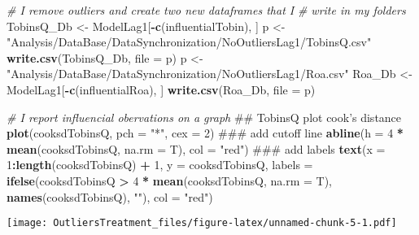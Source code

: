 \documentclass[]{article}
\newenvironment{Shaded}{\begin{snugshade}}{\end{snugshade}}
\newcommand{\KeywordTok}[1]{\textcolor[rgb]{0.13,0.29,0.53}{\textbf{#1}}}
\newcommand{\DataTypeTok}[1]{\textcolor[rgb]{0.13,0.29,0.53}{#1}}
\newcommand{\DecValTok}[1]{\textcolor[rgb]{0.00,0.00,0.81}{#1}}
\newcommand{\StringTok}[1]{\textcolor[rgb]{0.31,0.60,0.02}{#1}}
\newcommand{\CommentTok}[1]{\textcolor[rgb]{0.56,0.35,0.01}{\textit{#1}}}
\newcommand{\OperatorTok}[1]{\textcolor[rgb]{0.81,0.36,0.00}{\textbf{#1}}}
\newcommand{\NormalTok}[1]{#1}
\begin{document}
\begin{Shaded}
\begin{Highlighting}[]
\CommentTok{# I remove outliers and create two new dataframes that I}
\CommentTok{# write in my folders}
\NormalTok{TobinsQ_Db <-}\StringTok{ }\NormalTok{ModelLag1[}\OperatorTok{-}\KeywordTok{c}\NormalTok{(influentialTobin), ]}
\NormalTok{p <-}\StringTok{ "Analysis/DataBase/DataSynchronization/NoOutliersLag1/TobinsQ.csv"}
\KeywordTok{write.csv}\NormalTok{(TobinsQ_Db, }\DataTypeTok{file =}\NormalTok{ p)}
\NormalTok{p <-}\StringTok{ "Analysis/DataBase/DataSynchronization/NoOutliersLag1/Roa.csv"}
\NormalTok{Roa_Db <-}\StringTok{ }\NormalTok{ModelLag1[}\OperatorTok{-}\KeywordTok{c}\NormalTok{(influentialRoa), ]}
\KeywordTok{write.csv}\NormalTok{(Roa_Db, }\DataTypeTok{file =}\NormalTok{ p)}
\end{Highlighting}
\end{Shaded}

\begin{Shaded}
\begin{Highlighting}[]
\CommentTok{# I report influencial obervations on a graph}
\NormalTok{## TobinsQ plot cook's distance}
\KeywordTok{plot}\NormalTok{(cooksdTobinsQ, }\DataTypeTok{pch =} \StringTok{"*"}\NormalTok{, }\DataTypeTok{cex =} \DecValTok{2}\NormalTok{)}
\NormalTok{### add cutoff line}
\KeywordTok{abline}\NormalTok{(}\DataTypeTok{h =} \DecValTok{4} \OperatorTok{*}\StringTok{ }\KeywordTok{mean}\NormalTok{(cooksdTobinsQ, }\DataTypeTok{na.rm =}\NormalTok{ T), }\DataTypeTok{col =} \StringTok{"red"}\NormalTok{)}
\NormalTok{### add labels}
\KeywordTok{text}\NormalTok{(}\DataTypeTok{x =} \DecValTok{1}\OperatorTok{:}\KeywordTok{length}\NormalTok{(cooksdTobinsQ) }\OperatorTok{+}\StringTok{ }\DecValTok{1}\NormalTok{, }\DataTypeTok{y =}\NormalTok{ cooksdTobinsQ, }
    \DataTypeTok{labels =} \KeywordTok{ifelse}\NormalTok{(cooksdTobinsQ }\OperatorTok{>}\StringTok{ }\DecValTok{4} \OperatorTok{*}\StringTok{ }\KeywordTok{mean}\NormalTok{(cooksdTobinsQ, }
        \DataTypeTok{na.rm =}\NormalTok{ T), }\KeywordTok{names}\NormalTok{(cooksdTobinsQ), }\StringTok{""}\NormalTok{), }\DataTypeTok{col =} \StringTok{"red"}\NormalTok{)}
\end{Highlighting}
\end{Shaded}

\texttt{[image: OutliersTreatment\_files/figure-latex/unnamed-chunk-5-1.pdf]}

\newpage
\end{document}
